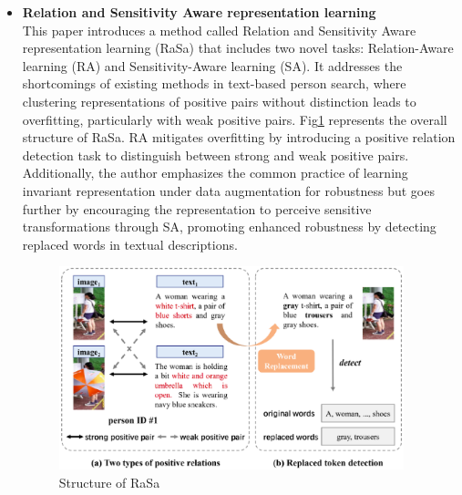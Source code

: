 \begin{itemize}
    \item \textbf{Relation and Sensitivity Aware representation learning}\\
    This paper introduces a method called Relation and Sensitivity Aware representation learning (RaSa) that includes two novel tasks: Relation-Aware learning (RA) and Sensitivity-Aware learning (SA). It addresses the shortcomings of existing methods in text-based person search, where clustering representations of positive pairs without distinction leads to overfitting, particularly with weak positive pairs. Fig\ref{fig:rasa} represents the overall structure of RaSa. RA mitigates overfitting by introducing a positive relation detection task to distinguish between strong and weak positive pairs. Additionally, the author emphasizes the common practice of learning invariant representation under data augmentation for robustness but goes further by encouraging the representation to perceive sensitive transformations through SA, promoting enhanced robustness by detecting replaced words in textual descriptions.
    \begin{figure}[htbp]
        \begin{center}
            \includegraphics[width=10cm]{img/rasa.eps}
            \caption{Structure of RaSa}\label{fig:rasa}
        \end{center}
    \end{figure}
    

\end{itemize}
